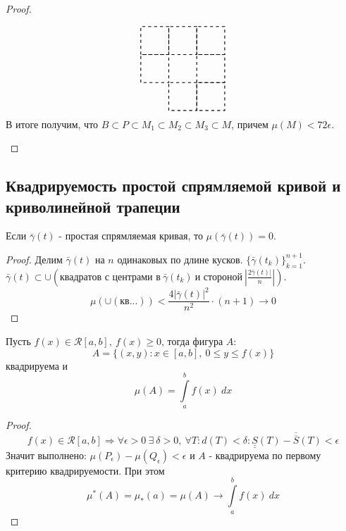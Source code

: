 \begin{proof}
\begin{enumerate}
\[\begin{tikzpicture}
            \draw[thick, dashed] (0.5, 1.5) rectangle (1.5, 2.5);
            \draw[thick, dashed] (0.5, 2.5) rectangle (1.5, 3.5);
            \draw[thick, dashed] (1.5, 2.5) rectangle (2.5, 3.5);
            \draw[thick, dashed] (2.5, 2.5) rectangle (3.5, 3.5);
            \draw[thick, dashed] (1.5, 0.5) rectangle (2.5, 1.5);
            \draw[thick, dashed] (2.5, 0.5) rectangle (3.5, 1.5);
            \draw[thick, dashed] (2.5, 1.5) rectangle (3.5, 2.5);
        \end{tikzpicture}
        \]
        В итоге получим, что $B\subset P\subset M_1\subset M_2\subset M_3\subset M$, причем $\mu(M)<72\epsilon$.
    \end{enumerate}
\end{proof} 

\subsection{Квадрируемость простой спрямляемой кривой и криволинейной трапеции}
\begin{theorem}
    Если $\bar{\gamma}(t)$ - простая спрямляемая кривая, то $\mu(\bar{\gamma}(t))=0$.
\end{theorem} 
\begin{proof}
    Делим $\bar{\gamma}(t)$ на $n$ одинаковых по длине кусков. $\{\bar{\gamma}(t_k)\}_{k=1}^{n+1}$. $\bar{\gamma}(t)\subset \cup(\text{квадратов с центрами в}\  \bar{\gamma}(t_k)\ \text{и стороной}\ |\frac{2\bar{\gamma}(t)|}{n}|)$. 
    \[\mu(\cup(\text{кв...}))<\frac{4|\bar{\gamma}(t)|^2}{n^2}\cdot (n+1)\to 0\]
\end{proof} 
\begin{theorem}
    Пусть $f(x)\in \mathcal{R}[a,b],\ f(x)\geq 0$, тогда фигура $A:$ 
    \[A=\{(x,y): x\in[a,b],\ 0\leq y\leq f(x)\}\] квадрируема и 
    \[\mu(A)=\int\limits_{a}^{b}f(x)\ dx\]
\end{theorem} 
\begin{proof}
    \[f(x)\in \mathcal{R}[a,b] \Rightarrow \forall \epsilon>0\ \exists\ \delta>0,\ \forall T: d(T)<\delta: \underline{\underline{S}}(T)-\overline{\overline{S}}(T)<\epsilon\]
    Значит выполнено: $\mu(P_{\epsilon})-\mu(Q_{\epsilon})<\epsilon$ и $A$ - квадрируема по первому критерию квадрируемости. При этом
    \[\mu^*(A)=\mu_*(a)=\mu(A) \to \int\limits_{a}^{b}f(x)\ dx\]
\end{proof} 